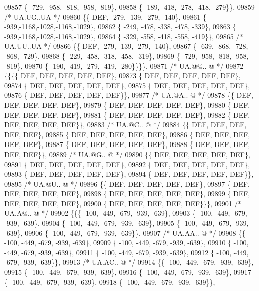 \begin{DoxyCode}
09857 \{ -729, -958, -818, -958, -819\},
09858 \{ -189, -418, -278, -418, -279\}\},
09859 \textcolor{comment}{/* UA.UG..UA */}
09860 \{\{  DEF, -279, -139, -279, -140\},
09861 \{ -939,-1168,-1028,-1168,-1029\},
09862 \{ -249, -478, -338, -478, -339\},
09863 \{ -939,-1168,-1028,-1168,-1029\},
09864 \{ -329, -558, -418, -558, -419\}\},
09865 \textcolor{comment}{/* UA.UU..UA */}
09866 \{\{  DEF, -279, -139, -279, -140\},
09867 \{ -639, -868, -728, -868, -729\},
09868 \{ -229, -458, -318, -458, -319\},
09869 \{ -729, -958, -818, -958, -819\},
09870 \{ -190, -419, -279, -419, -280\}\}\}\},
09871 \textcolor{comment}{/* UA.@@.. @ */}
09872 \{\{\{\{  DEF,  DEF,  DEF,  DEF,  DEF\},
09873 \{  DEF,  DEF,  DEF,  DEF,  DEF\},
09874 \{  DEF,  DEF,  DEF,  DEF,  DEF\},
09875 \{  DEF,  DEF,  DEF,  DEF,  DEF\},
09876 \{  DEF,  DEF,  DEF,  DEF,  DEF\}\},
09877 \textcolor{comment}{/* UA.@A.. @ */}
09878 \{\{  DEF,  DEF,  DEF,  DEF,  DEF\},
09879 \{  DEF,  DEF,  DEF,  DEF,  DEF\},
09880 \{  DEF,  DEF,  DEF,  DEF,  DEF\},
09881 \{  DEF,  DEF,  DEF,  DEF,  DEF\},
09882 \{  DEF,  DEF,  DEF,  DEF,  DEF\}\},
09883 \textcolor{comment}{/* UA.@C.. @ */}
09884 \{\{  DEF,  DEF,  DEF,  DEF,  DEF\},
09885 \{  DEF,  DEF,  DEF,  DEF,  DEF\},
09886 \{  DEF,  DEF,  DEF,  DEF,  DEF\},
09887 \{  DEF,  DEF,  DEF,  DEF,  DEF\},
09888 \{  DEF,  DEF,  DEF,  DEF,  DEF\}\},
09889 \textcolor{comment}{/* UA.@G.. @ */}
09890 \{\{  DEF,  DEF,  DEF,  DEF,  DEF\},
09891 \{  DEF,  DEF,  DEF,  DEF,  DEF\},
09892 \{  DEF,  DEF,  DEF,  DEF,  DEF\},
09893 \{  DEF,  DEF,  DEF,  DEF,  DEF\},
09894 \{  DEF,  DEF,  DEF,  DEF,  DEF\}\},
09895 \textcolor{comment}{/* UA.@U.. @ */}
09896 \{\{  DEF,  DEF,  DEF,  DEF,  DEF\},
09897 \{  DEF,  DEF,  DEF,  DEF,  DEF\},
09898 \{  DEF,  DEF,  DEF,  DEF,  DEF\},
09899 \{  DEF,  DEF,  DEF,  DEF,  DEF\},
09900 \{  DEF,  DEF,  DEF,  DEF,  DEF\}\}\},
09901 \textcolor{comment}{/* UA.A@.. @ */}
09902 \{\{\{ -100, -449, -679, -939, -639\},
09903 \{ -100, -449, -679, -939, -639\},
09904 \{ -100, -449, -679, -939, -639\},
09905 \{ -100, -449, -679, -939, -639\},
09906 \{ -100, -449, -679, -939, -639\}\},
09907 \textcolor{comment}{/* UA.AA.. @ */}
09908 \{\{ -100, -449, -679, -939, -639\},
09909 \{ -100, -449, -679, -939, -639\},
09910 \{ -100, -449, -679, -939, -639\},
09911 \{ -100, -449, -679, -939, -639\},
09912 \{ -100, -449, -679, -939, -639\}\},
09913 \textcolor{comment}{/* UA.AC.. @ */}
09914 \{\{ -100, -449, -679, -939, -639\},
09915 \{ -100, -449, -679, -939, -639\},
09916 \{ -100, -449, -679, -939, -639\},
09917 \{ -100, -449, -679, -939, -639\},
09918 \{ -100, -449, -679, -939, -639\}\},

\end{DoxyCode}
